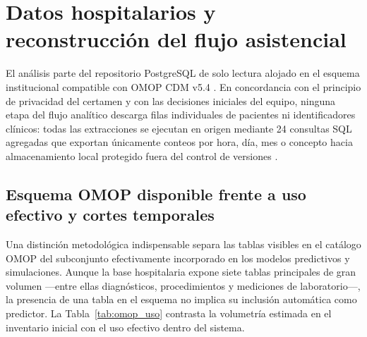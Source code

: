 
\section{Datos hospitalarios y reconstrucción del flujo asistencial}

El análisis parte del repositorio PostgreSQL de solo lectura alojado en el esquema institucional compatible con OMOP CDM v5.4 \parencite{ohdsi54,mediflow2026inventario}. En concordancia con el principio de privacidad del certamen y con las decisiones iniciales del equipo, ninguna etapa del flujo analítico descarga filas individuales de pacientes ni identificadores clínicos: todas las extracciones se ejecutan en origen mediante 24 consultas SQL agregadas que exportan únicamente conteos por hora, día, mes o concepto hacia almacenamiento local protegido fuera del control de versiones \parencite{mediflow2026informe,mediflow2026auditoria}.

\subsection{Esquema OMOP disponible frente a uso efectivo y cortes temporales}

Una distinción metodológica indispensable separa las tablas visibles en el catálogo OMOP del subconjunto efectivamente incorporado en los modelos predictivos y simulaciones. Aunque la base hospitalaria expone siete tablas principales de gran volumen ---entre ellas diagnósticos, procedimientos y mediciones de laboratorio---, la presencia de una tabla en el esquema no implica su inclusión automática como predictor. La Tabla~\ref{tab:omop_uso} contrasta la volumetría estimada en el inventario inicial con el uso efectivo dentro del sistema.

